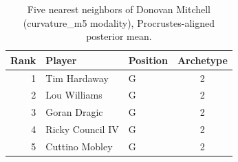 \begin{table}[htbp]
  \centering\small
  \begin{tabular}{rllc}
    \toprule
    Rank & Player & Position & Archetype \\
    \midrule
    1 & Tim Hardaway & G & 2 \\
    2 & Lou Williams & G & 2 \\
    3 & Goran Dragic & G & 2 \\
    4 & Ricky Council IV & G & 2 \\
    5 & Cuttino Mobley & G & 2 \\
    \bottomrule
  \end{tabular}
  \caption{Five nearest neighbors of Donovan Mitchell (curvature_m5 modality), Procrustes-aligned posterior mean.}
  \label{tab:Donovan_Mitchell_neighbors_curvature_m5}
\end{table}


